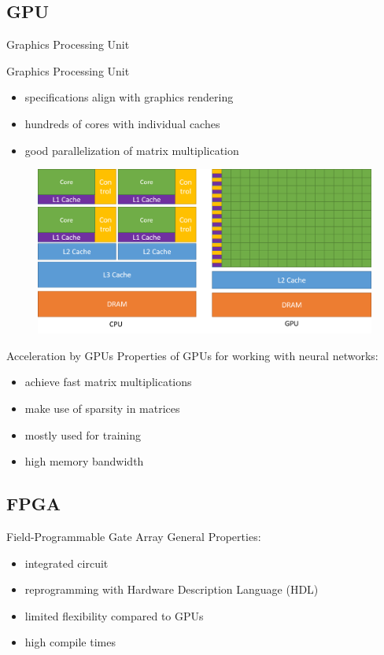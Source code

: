 \documentclass[en]{sdqbeamer}
\begin{document}
\subsection{GPU}
\begin{frame}{Graphics Processing Unit}
	\begin{minipage}[b]{0.45\paperwidth}
		Graphics Processing Unit
		\begin{itemize}
			\item specifications align with graphics rendering
			\item hundreds of cores with individual caches
			\item good parallelization of matrix multiplication
		\end{itemize}
	\end{minipage}
	\begin{minipage}{0.45\paperwidth}
		\begin{figure}
			\includegraphics[width= 0.47\paperwidth, right]{pictures/intel_comparison.png}
		\end{figure}
	\end{minipage}
\end{frame}

\begin{frame}{Acceleration by GPUs}
	Properties of GPUs for working with neural networks:
	\begin{itemize}
		\item achieve fast matrix multiplications
		\item make use of sparsity in matrices
		\item mostly used for training
		\item high memory bandwidth
	\end{itemize}
\end{frame}

\subsection{FPGA}
\begin{frame}{Field-Programmable Gate Array}
	General Properties:
	\begin{itemize}
		\item integrated circuit
		\item reprogramming with Hardware Description Language (HDL)
		\item limited flexibility compared to GPUs
		\item high compile times
	\end{itemize}
\end{frame}
\end{document}
